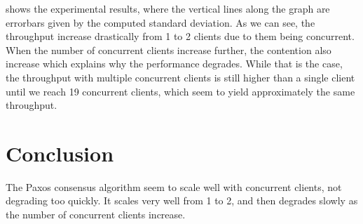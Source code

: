 \documentclass[conference]{IEEEtran}
\begin{document}
 shows the experimental results, where the vertical lines along the graph are errorbars given by the computed standard deviation.
As we can see, the throughput increase drastically from 1 to 2 clients due to them being concurrent.
When the number of concurrent clients increase further, the contention also increase which explains why the performance degrades.
While that is the case, the throughput with multiple concurrent clients is still higher than a single client until we reach 19 concurrent clients, which seem to yield approximately the same throughput.

\section{Conclusion}
The Paxos consensus algorithm seem to scale well with concurrent clients, not degrading too quickly.
It scales very well from 1 to 2, and then degrades slowly as the number of concurrent clients increase.

\printbibliography
\end{document}
